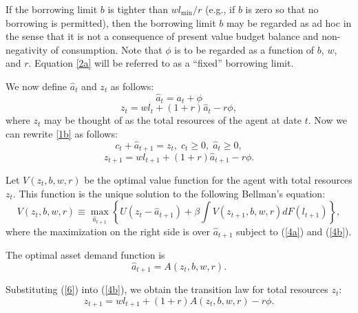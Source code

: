 \documentclass[12pt]{article}
\theoremstyle{definition}
\begin{document}
If the borrowing limit $b$ is tighter than $wl_{\min}/r$ (e.g., if $b$ is zero so that no borrowing is permitted), then the borrowing limit $b$ may be regarded as ad hoc in the sense that it is not a consequence of present value budget balance and non-negativity of consumption. Note that $\phi$ is to be regarded as a function of $b$, $w$, and $r$. Equation \ref{2a} will be referred to as a ``fixed'' borrowing limit. 

We now define $\hat{a}_t$ and $z_t$ as follows:
\begin{equation}
	\label{3a} \tag{3a}
	\hat{a}_t = a_t + \phi
\end{equation}
\begin{equation}
	\label{3b} \tag{3b}
	z_t = w l_t + (1+r) \hat{a}_t - r\phi,
\end{equation}
where $z_t$ may be thought of as the total resources of the agent at date $t$. Now we can rewrite \ref{1b} as follows:
\begin{equation}
	\label{4a} \tag{4a}
	c_t + \hat{a}_{t+1} = z_t, \; c_t \geq 0, \; \hat{a}_t \geq 0,
\end{equation}
\begin{equation}
	\label{4b} \tag{4b}
	z_{t+1} = w l_{t+1} + (1+r) \hat{a}_{t+1} - r\phi.
\end{equation}

Let $V(z_t, b, w, r)$ be the optimal value function for the agent with total resources $z_t$. This function is the unique solution to the following Bellman's equation:
\begin{equation}
	\label{5} \tag{5}
	V\left(z_t, b, w, r\right) \equiv \max_{\hat{a}_{t+1}} \left\{U\left(z_t-\hat{a}_{t+1}\right)+\beta \int V\left(z_{t+1}, b, w, r\right) d F\left(l_{t+1}\right)\right\},
\end{equation}
where the maximization on the right side is over $\hat{a}_{t+1}$ subject to (\ref{4a}) and (\ref{4b}).

The optimal asset demand function is 
\begin{equation}
	\label{6} \tag{6}
	\hat{a}_{t+1} = A(z_t, b, w, r).
\end{equation}

Substituting (\ref{6}) into (\ref{4b}), we obtain the transition law for total resources $z_t$:
\begin{equation}
	\label{7} \tag{7}
	z_{t+1} = w l_{t+1} + (1+r)A(z_t, b, w, r) - r\phi.
\end{equation}
\end{document}
